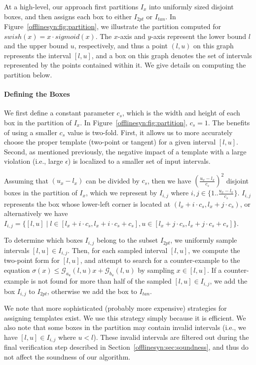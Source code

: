At a high-level, our
approach first partitions $ I_x $ into uniformly sized disjoint boxes, and then
assigns each box to either $ I_{2pt} $ or $ I_{tan} $. In
Figure~\ref{offlinesyn:fig:partition}, we illustrate the partition computed for $
swish(x)
= x \cdot sigmoid(x) $. The $x$-axis and $y$-axis represent the lower bound $ l
$ and
the upper bound $ u $, respectively, and thus a point $ (l, u) $ on this graph
represents the interval $ [l, u] $, and a box on this graph denotes  the set
of intervals represented by the points contained within it. We give details on
computing the partition below.

\paragraph{Defining the Boxes}

We first define a constant parameter $ c_s $, which is the width and height
of each box in the partition of $ I_x $. In
Figure~\ref{offlinesyn:fig:partition},
$ c_s =
1 $. The benefits of using a smaller $ c_s $ value is two-fold. First, it allows
us to more accurately choose the proper template (two-point or tangent) for a
given interval $ [l, u] $. Second, as mentioned previously, the negative impact
of a template with a large violation (i.e., large $ \epsilon $) is localized to
a smaller set of input intervals.

Assuming that $ (u_x - l_x) $ can be divided by $c_s$, then we have $
(\frac{u_x -l_x}{c_s})^2 $ disjoint boxes in the partition of $ I_x $, which we
represent by $ I_{i,j} $ where $ i,j \in \{1..\frac{u_x - l_x}{c_s}\} $.
%
$ I_{i,j} $ represents the box whose lower-left corner is located at $ (l_x + i
\cdot c_s, l_x + j \cdot c_s) $, or
%
alternatively we have $ I_{i, j} = \{ [l,u] \mid l\in [l_x + i \cdot c_s, l_x +
i \cdot c_s + c_s], u \in [l_x + j \cdot c_s, l_x + j \cdot c_s + c_s]\}$.


To determine which boxes $ I_{i,j} $ belong to the subset $ I_{2pt} $, we
uniformly sample intervals $ [l, u] \in I_{i,j} $. Then, for each sampled
interval $ [l, u] $, we compute the two-point form for $ [l, u] $, and attempt
to search for a counter-example to the equation $ \sigma(x) \leq
\mathcal{G}_{a_u}(l, u)x + \mathcal{G}_{b_u}(l, u) $ by sampling $ x
\in [l, u] $.
%
If a counter-example is not found for more than half of the
sampled $ [l, u] \in I_{i,j} $, we add the box $ I_{i, j} $ to $ I_{2pt} $,
otherwise we add the box to $ I_{tan} $.

We note that more sophisticated (probably more expensive) strategies for
assigning templates exist. We use this strategy simply because it is efficient.
We also note that some boxes in the partition may contain invalid intervals
(i.e., we have $ [l, u] \in I_{i,j} $ where $ u < l $). These invalid intervals
are filtered out during the final verification step  described in
Section~\ref{offlinesyn:sec:soundness}, and thus do not affect the soundness of
our
algorithm.

